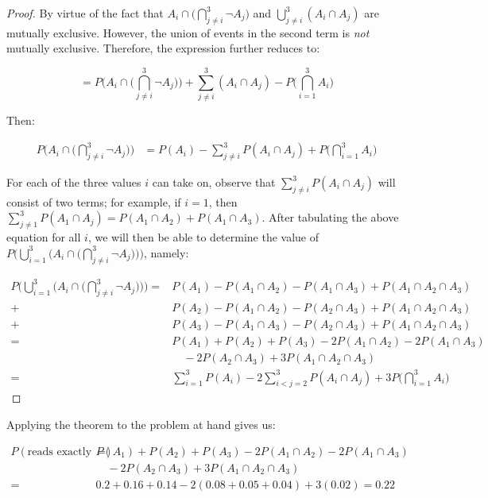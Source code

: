 \documentclass[10pt, oneside]{article}   	%
\theoremstyle{definition}
\begin{document}
\begin{enumerate}[label=3.\arabic*]
\begin{proof}
By virtue of the fact that $A_i  \cap \Big( \bigcap^3_{j \neq i} \neg A_j \Big)$ and $\bigcup^3_{j \neq i} (A_i \cap A_j)$ are mutually exclusive. However, the union of events in the second term is \textit{not} mutually exclusive. Therefore, the expression further reduces to:

\[ = P\Bigg( A_i  \cap \Big( \bigcap^3_{j \neq i} \neg A_j \Big) \Bigg) + \sum^3_{j \neq i} (A_i \cap A_j) - P\Bigg( \bigcap^3_{i = 1} A_i \Bigg) \]

Then:

\begin{align*}
P \Bigg( A_i  \cap \Big( \bigcap^3_{j \neq i} \neg A_j \Big) \Bigg) &= P(A_i) - \sum^3_{j \neq i} P(A_i \cap A_j) + P \Bigg( \bigcap^3_{i=1} A_i \Bigg)
\end{align*}

For each of the three values $i$ can take on, observe that $\sum^3_{j \neq i} P(A_i \cap A_j)$ will consist of two terms; for example, if $i = 1$, then $\sum^3_{j \neq 1} P(A_1 \cap A_j) = P(A_1 \cap A_2) + P(A_1 \cap A_3)$. After tabulating the above equation for all $i$, we will then be able to determine the value of $P \Bigg( \bigcup^3_{i=1} \bigg( A_i  \cap \Big( \bigcap^3_{j \neq i} \neg A_j \Big) \bigg) \Bigg) $, namely:

\begin{align*}
P \Bigg( \bigcup^3_{i=1} \bigg( A_i  \cap \Big( \bigcap^3_{j \neq i} \neg A_j \Big) \bigg) \Bigg) = &P(A_1) - P(A_1 \cap A_2) - P(A_1 \cap A_3) + P(A_1 \cap A_2 \cap A_3) \\
+&P(A_2) - P(A_1 \cap A_2) - P(A_2 \cap A_3) + P(A_1 \cap A_2 \cap A_3) \\
+&P(A_3) - P(A_1 \cap A_3) - P(A_2 \cap A_3) + P(A_1 \cap A_2 \cap A_3) \\
= &P(A_1) + P(A_2) + P(A_3) - 2P(A_1 \cap A_2) - 2P(A_1 \cap A_3) \\
&\quad - 2P(A_2 \cap A_3) + 3P(A_1 \cap A_2 \cap A_3) \\
= &\boxed{ \sum^3_{i = 1} P(A_i) - 2 \sum^3_{i < j = 2} P(A_i \cap A_j) + 3 P\Bigg( \bigcap^3_{i=1} A_i \Bigg) }
\end{align*} 

\end{proof}

Applying the theorem to the problem at hand gives us:

\begin{align*}
P(\text{reads exactly one paper}) = &P(A_1) + P(A_2) + P(A_3) - 2P(A_1 \cap A_2) - 2P(A_1 \cap A_3) \\
&\quad - 2P(A_2 \cap A_3) + 3P(A_1 \cap A_2 \cap A_3) \\
= &0.2+0.16+0.14-2\left(0.08+0.05+0.04\right)+3\left(0.02\right) = \boxed{0.22}
\end{align*}


\end{enumerate}
\end{document}
